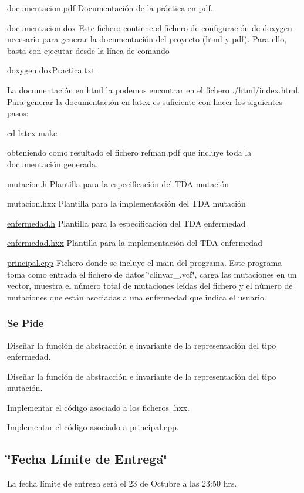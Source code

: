 \begin{DoxyItemize}
\item documentacion.\+pdf Documentación de la práctica en pdf. \item \hyperlink{documentacion_8dox}{documentacion.\+dox} Este fichero contiene el fichero de configuración de doxygen necesario para generar la documentación del proyecto (html y pdf). Para ello, basta con ejecutar desde la línea de comando 
\begin{DoxyCode}
doxygen doxPractica.txt
\end{DoxyCode}
 La documentación en html la podemos encontrar en el fichero ./html/index.html. Para generar la documentación en latex es suficiente con hacer los siguientes pasos\+: 
\begin{DoxyCode}
cd latex
make
\end{DoxyCode}
 obteniendo como resultado el fichero refman.\+pdf que incluye toda la documentación generada.\end{DoxyItemize}
\begin{DoxyItemize}
\item \hyperlink{mutacion_8h}{mutacion.\+h} Plantilla para la especificación del T\+DA mutación \item mutacion.\+hxx Plantilla para la implementación del T\+DA mutación \item \hyperlink{enfermedad_8h}{enfermedad.\+h} Plantilla para la especificación del T\+DA enfermedad \item \hyperlink{enfermedad_8hxx}{enfermedad.\+hxx} Plantilla para la implementación del T\+DA enfermedad\end{DoxyItemize}
\begin{DoxyItemize}
\item \hyperlink{principal_8cpp}{principal.\+cpp} Fichero donde se incluye el main del programa. Este programa toma como entrada el fichero de datos \char`\"{}clinvar\+\_.\+vcf\char`\"{}, carga las mutaciones en un vector, muestra el número total de mutaciones leídas del fichero y el número de mutaciones que están asociadas a una enfermedad que indica el usuario.\end{DoxyItemize}
\hypertarget{index_ssPide}{}\subsubsection{Se Pide}\label{index_ssPide}
\begin{DoxyItemize}
\item Diseñar la función de abstracción e invariante de la representación del tipo enfermedad. \item Diseñar la función de abstracción e invariante de la representación del tipo mutación. \item Implementar el código asociado a los ficheros .hxx. \item Implementar el código asociado a \hyperlink{principal_8cpp}{principal.\+cpp}.\end{DoxyItemize}
\hypertarget{index_fecha}{}\subsection{\char`\"{}\+Fecha Límite de Entrega\char`\"{}}\label{index_fecha}
La fecha límite de entrega será el 23 de Octubre a las 23\+:50 hrs. 